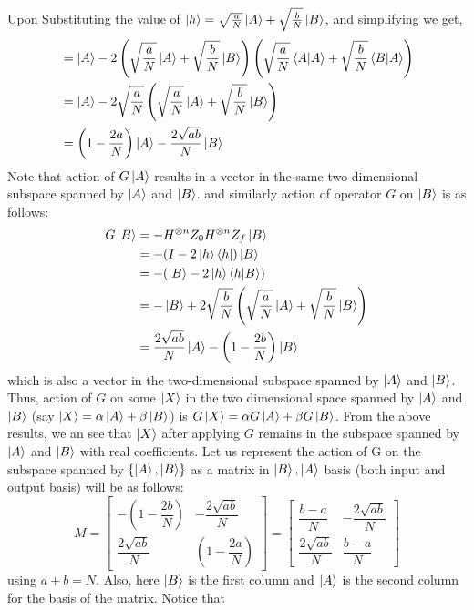 Upon Substituting the value of $\ket{h}=\sqrt{\frac{a} {N}}\ket{A}+\sqrt{\frac{b}{N}}\ket{B}$, and simplifying we get,
\begin{align*}
    &=\ket{A}-2\left(\sqrt{\frac{a} {N}}\ket{A}+\sqrt{\frac{b}{N}}\ket{B}\right)\left(\sqrt{\frac{a} {N}}\braket{A|A}+\sqrt{\frac{b}{N}}\braket{B|A}\right)\\
    &=\ket{A}-2\sqrt{\frac{a}{N}}\left(\sqrt{\frac{a} {N}}\ket{A}+\sqrt{\frac{b}{N}}\ket{B}\right)\\
    &=\left(1-\frac{2a}{N}\right)\ket{A}-\frac{2\sqrt{ab}}{N}\ket{B}\\
\end{align*}
Note that action of $G\ket{A}$ results in a vector in the same two-dimensional subspace spanned by $\ket{A}$ and $\ket{B}$.
and similarly action of operator $G$ on $\ket{B}$ is as follows:
\begin{align*}
    G\ket{B}&=-H^{\otimes n}Z_0H^{\otimes n}Z_f\ket{B}\\
    &=-(I-2\ket{h}\bra{h})\ket{B}\\
    &=-(\ket{B}-2\ket{h}\braket{h|B})\\
    &=-\ket{B}+2\sqrt{\frac{b}{N}}\left(\sqrt{\frac{a}{N}}\ket{A}+\sqrt{\frac{b}{N}}\ket{B}\right)\\
    &=\frac{2\sqrt{ab}}{N}\ket{A}-\left(1-\frac{2b}{N}\right)\ket{B}
\end{align*}
which is also a vector in the two-dimensional subspace spanned by $\ket{A}$ and $\ket{B}$. Thus, action of $G$ on some $\ket{X}$ in the two dimensional space spanned by $\ket{A}$ and $\ket{B}$ (say $\ket{X}=\alpha\ket{A}+\beta\ket{B}$) is $G\ket{X}=\alpha G\ket{A}+\beta G\ket{B}$. From the above results, we an see that $\ket{X}$ after applying $G$ remains in the subspace spanned by $\ket{A}$ and $\ket{B}$ with real coefficients. Let us represent the action of G on the subspace spanned by $\{\ket{A},\ket{B}\}$ as a matrix in $\ket{B},\ket{A}$ basis (both input and output basis) will be as follows:
\[
M=\begin{bmatrix} -\left(1-\dfrac{2b}{N}\right) & -\dfrac{2\sqrt{ab}}{N} \\ \dfrac{2\sqrt{ab}}{N} & \left(1-\dfrac{2a}{N}\right) \end{bmatrix} = \begin{bmatrix} \dfrac{b-a}{N} & -\dfrac{2\sqrt{ab}}{N} \\ \dfrac{2\sqrt{ab}}{N} & \dfrac{b-a}{N} \end{bmatrix}
\]
using $a+b=N$. Also, here $\ket{B}$ is the first column and $\ket{A}$ is the second column for the basis of the matrix. Notice that

